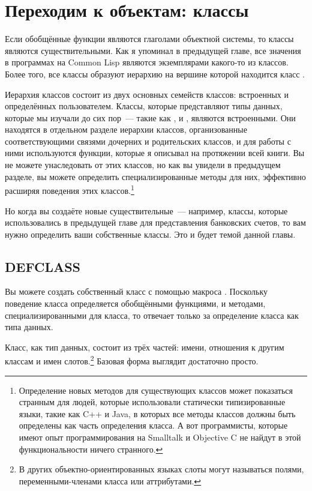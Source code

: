 \chapter{Переходим к объектам: классы}
\label{ch:17}

Если обобщённые функции являются глаголами объектной системы, то классы являются
существительными.  Как я упоминал в предыдущей главе, все значения в программах на Common
Lisp являются экземплярами какого-то из классов.  Более того, все классы образуют иерархию
на вершине которой находится класс .

Иерархия классов состоит из двух основных семейств классов: встроенных и определённых
пользователем.  Классы, которые представляют типы данных, которые мы изучали до сих
пор~--- такие как ,  и , являются встроенными.  Они
находятся в отдельном разделе иерархии классов, организованные соответствующими связями
дочерних и родительских классов, и для работы с ними используются функции, которые я
описывал на протяжении всей книги.  Вы не можете унаследовать от этих классов, но как вы
увидели в предыдущем разделе, вы можете определить специализированные методы для них,
эффективно расширяя поведения этих классов.\footnote{Определение новых методов для
    существующих классов может показаться странным для людей, которые использовали
    статически типизированные языки, такие как C++ и Java, в которых все методы классов
    должны быть определены как часть определения класса.  А вот программисты, которые
    имеют опыт программирования на Smalltalk и Objective C не найдут в этой
функциональности ничего странного.}

Но когда вы создаёте новые существительные~--- например, классы, которые использовались в
предыдущей главе для представления банковских счетов, то вам нужно определить ваши
собственные классы.  Это и будет темой данной главы.

\section{DEFCLASS}

Вы можете создать собственный класс с помощью макроса .  Поскольку
поведение класса определяется обобщёнными функциями, и методами, специализированными для
класса, то  отвечает только за определение класса как типа данных.

Класс, как тип данных, состоит из трёх частей: имени, отношения к другим классам и имен
слотов.\footnote{В других объектно-ориентированных языках слоты могут называться полями,
переменными-членами класса или аттрибутами.}  Базовая форма  выглядит
достаточно просто.

